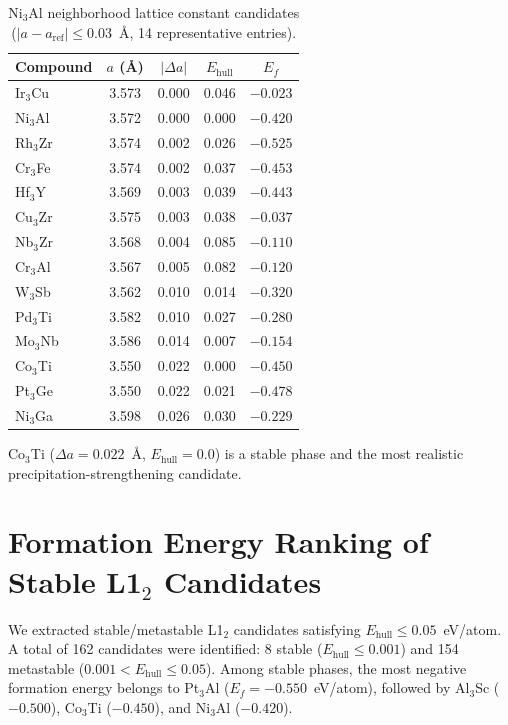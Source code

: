 \documentclass{npj-compt.mater}
\begin{document}
\begin{table}[htbp]
  \centering
  \caption{Ni$_3$Al neighborhood lattice constant candidates ($|a - a_{\text{ref}}| \leq 0.03$~\AA, 14 representative entries).}
  \label{tab:sup_lattice_match}
  \small
  \begin{tabular}{lcccc}
    \toprule
    Compound & $a$ (\AA) & $|\Delta a|$ & $E_\text{hull}$ & $E_f$ \\
    \midrule
    Ir$_3$Cu & 3.573 & 0.000 & 0.046 & $-0.023$ \\
    Ni$_3$Al & 3.572 & 0.000 & 0.000 & $-0.420$ \\
    Rh$_3$Zr & 3.574 & 0.002 & 0.026 & $-0.525$ \\
    Cr$_3$Fe & 3.574 & 0.002 & 0.037 & $-0.453$ \\
    Hf$_3$Y & 3.569 & 0.003 & 0.039 & $-0.443$ \\
    Cu$_3$Zr & 3.575 & 0.003 & 0.038 & $-0.037$ \\
    Nb$_3$Zr & 3.568 & 0.004 & 0.085 & $-0.110$ \\
    Cr$_3$Al & 3.567 & 0.005 & 0.082 & $-0.120$ \\
    W$_3$Sb & 3.562 & 0.010 & 0.014 & $-0.320$ \\
    Pd$_3$Ti & 3.582 & 0.010 & 0.027 & $-0.280$ \\
    Mo$_3$Nb & 3.586 & 0.014 & 0.007 & $-0.154$ \\
    Co$_3$Ti & 3.550 & 0.022 & 0.000 & $-0.450$ \\
    Pt$_3$Ge & 3.550 & 0.022 & 0.021 & $-0.478$ \\
    Ni$_3$Ga & 3.598 & 0.026 & 0.030 & $-0.229$ \\
    \bottomrule
  \end{tabular}
\end{table}

Co$_3$Ti ($\Delta a = 0.022$~\AA, $E_\text{hull} = 0.0$) is a
stable phase and the most realistic precipitation-strengthening
candidate.

\section{Formation Energy Ranking of Stable L1$_2$ Candidates}
\label{sec:sup_stable_l12}

We extracted stable/metastable L1$_2$ candidates satisfying
$E_\text{hull} \leq 0.05$~eV/atom.
A total of 162 candidates were identified: 8 stable
($E_\text{hull} \leq 0.001$) and 154 metastable
($0.001 < E_\text{hull} \leq 0.05$).
Among stable phases, the most negative formation energy belongs to
Pt$_3$Al ($E_f = -0.550$~eV/atom), followed by
Al$_3$Sc ($-0.500$), Co$_3$Ti ($-0.450$), and
Ni$_3$Al ($-0.420$).
\end{document}
